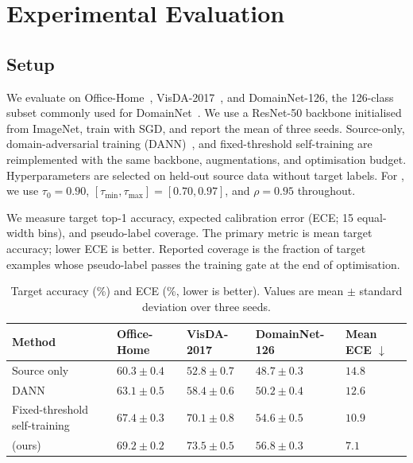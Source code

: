 \section{Experimental Evaluation}
\label{sec:experiments}

\subsection{Setup}

We evaluate on Office-Home~\citep{venkateswara2017officehome},
VisDA-2017~\citep{peng2017visda}, and DomainNet-126, the 126-class subset
commonly used for DomainNet~\citep{peng2019domainnet}. We use a ResNet-50
backbone initialised from ImageNet, train with SGD, and report the mean of three
seeds. Source-only, domain-adversarial training (DANN)~\citep{ganin2016domain},
and fixed-threshold self-training are reimplemented with the same backbone,
augmentations, and optimisation budget. Hyperparameters are selected on held-out
source data without target labels. For \method, we use $\tau_0=0.90$,
$[\tau_{\min},\tau_{\max}]=[0.70,0.97]$, and $\rho=0.95$ throughout.

We measure target top-1 accuracy, expected calibration error (ECE; 15 equal-width
bins), and pseudo-label coverage. The primary metric is mean target accuracy;
lower ECE is better. Reported coverage is the fraction of target examples whose
pseudo-label passes the training gate at the end of optimisation.

\begin{table}[t]
  \centering
  \caption{Target accuracy (\%) and ECE (\%, lower is better). Values are
  mean $\pm$ standard deviation over three seeds.}
  \label{tab:main}
  \small
  \setlength{\tabcolsep}{5pt}
  \begin{tabularx}{\textwidth}{@{}L *{3}{Y} Y@{}}
    \toprule
    Method & Office-Home & VisDA-2017 & DomainNet-126 & Mean ECE $\downarrow$ \\
    \midrule
    Source only
      & $60.3\pm0.4$ & $52.8\pm0.7$ & $48.7\pm0.3$ & $14.8$ \\
    DANN~\citep{ganin2016domain}
      & $63.1\pm0.5$ & $58.4\pm0.6$ & $50.2\pm0.4$ & $12.6$ \\
    Fixed-threshold self-training
      & $67.4\pm0.3$ & $70.1\pm0.8$ & $54.6\pm0.5$ & $10.9$ \\
    \method{} (ours)
      & $\mathbf{69.2\pm0.2}$ & $\mathbf{73.5\pm0.5}$
      & $\mathbf{56.8\pm0.3}$ & $\mathbf{7.1}$ \\
    \bottomrule
  \end{tabularx}
\end{table}

